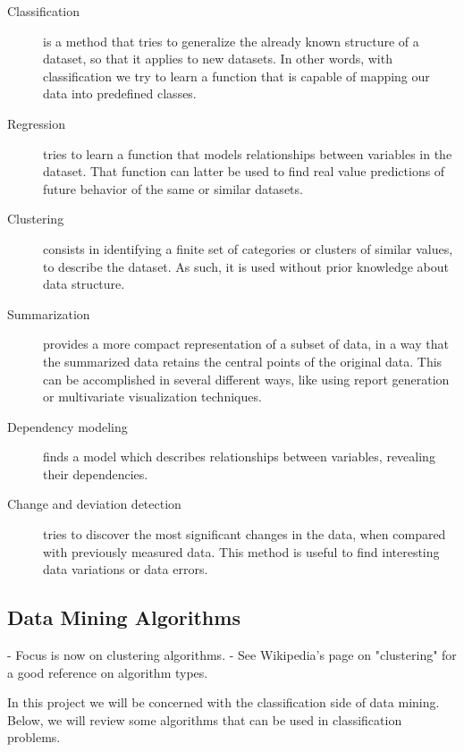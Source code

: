 \begin{description}

  \item[Classification]
  is a method that tries to generalize the already known structure of a
  dataset, so that it applies to new datasets. In other words, with
  classification we try to learn a function that is capable of mapping our data
  into predefined classes.

  \item[Regression]
  tries to learn a function that models relationships between variables in the
  dataset. That function can latter be used to find real value predictions of
  future behavior of the same or similar datasets.

  \item[Clustering]
  consists in identifying a finite set of categories or clusters of similar
  values, to describe the dataset. As such, it is used without prior knowledge
  about data structure.

  \item[Summarization]
  provides a more compact representation of a subset of data, in a way that the
  summarized data retains the central points of the original data. This can be
  accomplished in several different ways, like using report generation or
  multivariate visualization techniques.

  \item[Dependency modeling]
  finds a model which describes relationships between variables, revealing their
  dependencies.

  \item[Change and deviation detection]
  tries to discover the most significant changes in the data, when compared with
  previously measured data. This method is useful to find interesting data
  variations or data errors.

\end{description}

\subsection{Data Mining Algorithms}\label{sec:minalgo}

\begin{Notes}
- Focus is now on clustering algorithms.
- See Wikipedia's page on "clustering" for a good reference on algorithm types.\\
\end{Notes}

In this project we will be concerned with the classification side of data
mining. Below, we will review some algorithms that can be used in
classification problems.

